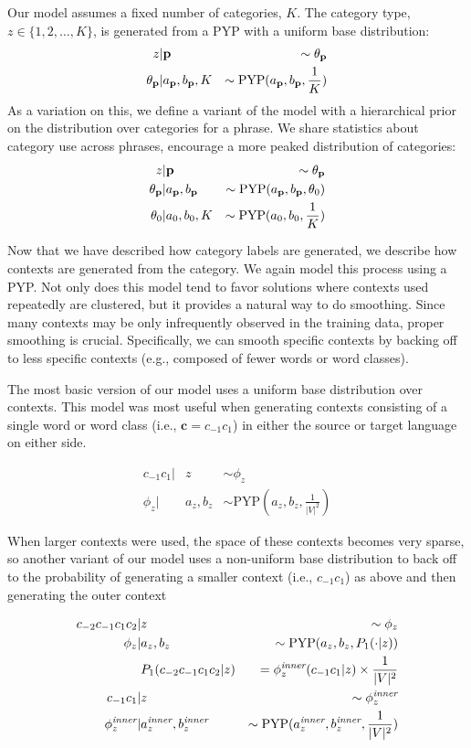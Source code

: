 Our model assumes a fixed number of categories, $K$. The category type, $z \in \{ 1 , 2 , \ldots , K \}$, is generated from a PYP with a uniform base distribution:
\begin{align*}
z &| \p & \sim \theta_{\p} \\
\theta_{\p} &| a_{\p},b_{\p},K & \sim \textrm{PYP}(a_{\p},b_{\p},\frac{1}{K})
\end{align*}
\noindent As a variation on this, we define a variant of the model with a hierarchical prior on the distribution over categories for a phrase.  We share statistics about category use across phrases, encourage a more peaked distribution of categories:
\begin{align*}
z &| \p & \sim \theta_{\p} \\
\theta_{\p} &| a_{\p},b_{\p} & \sim \textrm{PYP}(a_{\p},b_{\p},\theta_0) \\
\theta_0 &| a_0,b_0,K & \sim \textrm{PYP}(a_0,b_0,\frac{1}{K})
\end{align*}

\noindent Now that we have described how category labels are generated, we describe how contexts are generated from the category.  We again model this process using a PYP. Not only does this model tend to favor solutions where contexts used repeatedly are clustered, but it provides a natural way to do smoothing.  Since many contexts may be only infrequently observed in the training data, proper smoothing is crucial.  Specifically, we can smooth specific contexts by backing off to less specific contexts (e.g., composed of fewer words or word classes).

The most basic version of our model uses a uniform base distribution over contexts. This model was most useful when generating contexts consisting of a single word or word class (i.e., $\textbf{c}=c_{-1}c_1$) in either the source or target language on either side.

\begin{align*}
c_{-1}c_1 |& z & \sim \phi_z \\
\phi_z |& a_z,b_z & \sim \textrm{PYP}(a_z,b_z,\frac{1}{|V|^2})
\end{align*}

\noindent When larger contexts were used, the space of these contexts becomes very sparse, so another variant of our model uses a non-uniform base distribution to back off to the probability of generating a smaller context (i.e., $c_{-1}c_1$) as above and then generating the outer context

\begin{align*}
c_{-2}c_{-1}c_1c_2 |& z & \sim \phi_z \\
\phi_z |& a_z,b_z & \sim \textrm{PYP}(a_z,b_z,P_1(\cdot|z)) \\
&P_1(c_{-2}c_{-1}c_1c_2|z)& = \phi^{\textrm{\emph{inner}}}_z(c_{-1}c_1|z) \times \frac{1}{|V|^2} \\
c_{-1}c_1 |& z & \sim \phi^{\textrm{\emph{inner}}}_z \\
\phi^{\textrm{\emph{inner}}}_z |& a^{\textrm{\emph{inner}}}_z,b^{\textrm{\emph{inner}}}_z & \sim \textrm{PYP}(a^{\textrm{\emph{inner}}}_z,b^{\textrm{\emph{inner}}}_z,\frac{1}{|V|^2})
\end{align*}

